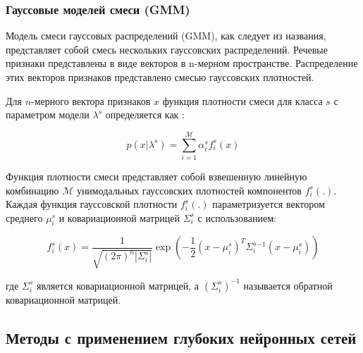 \subsubsection{Гауссовые моделей смеси (GMM)}

Модель смеси гауссовых распределений (GMM), как следует из названия, представляет собой смесь нескольких гауссовских распределений. Речевые признаки представлены в виде векторов в n-мерном пространстве. Распределение этих векторов признаков представлено смесью гауссовских плотностей. 

Для \(n\)-мерного вектора признаков \(x\) функция плотности смеси для класса \(s\) с параметром модели \(\lambda^{s}\) определяется как \cite{JOTHILAKSHMI2016301}:

\begin{equation}
    p(x | \lambda^{s}) = \sum_{i = 1}^{\mathcal{M}} \alpha^{s}_{i} f_{i}^{s}(x)
\end{equation}

Функция плотности смеси представляет собой взвешенную линейную комбинацию \(\mathcal{M}\) унимодальных гауссовских плотностей компонентов \(f_ {i}^{s}(.)\). Каждая функция гауссовской плотности \(f_{i}^{s}(.)\) параметризуется вектором среднего \(\mu_{i}^{s}\) и ковариационной матрицей \(\Sigma_{i}^{s}\) с использованием:

\begin{equation}
    f_{i}^{s}(x) = \frac{1}{\sqrt{(2\pi)^{n}|\Sigma_{i}^{s}|}} \exp \left(-\frac{1}{2}(x - \mu_{i}^{s})^T \Sigma_{i}^{s}^{-1} (x - \mu_{i}^{s})\right)
\end{equation}

где \(\Sigma_{i}^{s}\) является ковариационной матрицей, а \((\Sigma_{i}^{s})^{-1}\) называется обратной ковариационной матрицей.
% 

\subsection{Методы с применением глубоких нейронных сетей}


